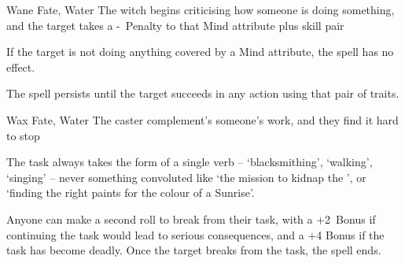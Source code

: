 \ifodd\value{diceNo}

  {}%
  {Wane}%
  {Fate, Water}%
  {}%
  {The \gls{witch} begins criticising how someone is doing something, and the target takes a -~Penalty to that Mind \gls{attribute} plus \gls{skill} pair}%
  {If the target is not doing anything covered by a Mind \gls{attribute}, the spell has no effect.

  The spell persists until the target succeeds in any action using that pair of \glspl{trait}.}

\else

  {}%
  {Wax}%
  {Fate, Water}%
  {}%
  {The caster complement's someone's work, and they find it hard to stop}%
  {The task always takes the form of a single verb -- `blacksmithing', `walking', `singing' -- never something convoluted like `the mission to kidnap the ', or `finding the right paints for the colour of a Sunrise'.

    Anyone can make a second roll to break from their task, with a +2~Bonus if continuing the task  would lead to serious consequences, and a +4 Bonus if the task has become deadly.
	Once the target breaks from the task, the spell ends.}

\fi
{}
